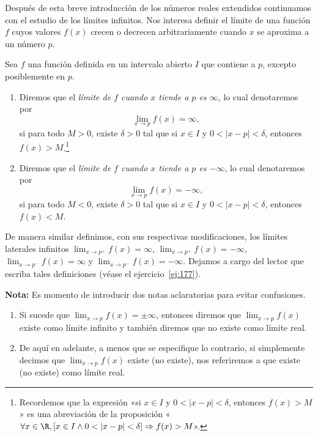 \documentclass[12pt,a4paper]{book}
\begin{document}
    Después de esta breve introducción de los números reales extendidos continuamos
    con el estudio de los límites infinitos. Nos interesa definir el límite de
    una función $f$ cuyos valores $f(x)$ crecen o decrecen arbitrariamente cuando
    $x$ se aproxima a un número $p$.

    \begin{definicion}\label{def:33}
        Sea $f$ una función definida en un intervalo
        abierto $I$ que contiene a $p$, excepto posiblemente en $p$.
        \begin{enumerate}
            \item Diremos que el \textit{límite de $f$ cuando $x$ tiende a $p$ es $\infty$}, lo cual denotaremos
            por
            \begin{equation}\label{eq:4.20}
                \lim_{x\to p}f(x)=\infty,
            \end{equation}
            si para todo $M>0$, existe $\delta>0$ tal que si $x\in I$ y $0<|x-p|<\delta$,
            entonces $f(x)>M$.\footnote{Recordemos que la expresión «si $x\in I$ y $0<|x-p|<\delta$, entonces $f(x)>M$» es una
            abreviación de la proposición «$\forall x\in\R,[x\in I\wedge 0<|x-p|<\delta]\Rightarrow f(x)>M$».}
            \item Diremos que el \textit{límite de $f$ cuando $x$ tiende a $p$ es $-\infty$}, lo cual denotaremos
            por
            \begin{equation}\label{eq:4.21}
                \lim_{x\to p}f(x)=-\infty,
            \end{equation}
            si para todo $M<0$, existe $\delta>0$ tal que si $x\in I$ y $0<|x-p|<\delta$,
            entonces $f(x)<M$.
        \end{enumerate}
    \end{definicion}

    De manera similar definimos, con sus respectivas modificaciones, los límites
    laterales infinitos $\lim_{x\to p^{+}}f(x)=\infty$, $\lim_{x\to p^{+}}f(x)=-\infty$, $\lim_{x\to p^{-}}f(x)=
    \infty$ y $\lim_{x\to p^{-}}f(x)=-\infty$. Dejamos a cargo del lector que escriba tales
    definiciones (véase el ejercicio~\ref{ej:177}).

    \textbf{Nota:} Es momento de introducir dos notas aclaratorias para evitar
    confusiones.
    \begin{enumerate}[label=\arabic*.,nosep]
        \item Si sucede que $\lim_{x\to p}f(x)=\pm\infty$, entonces diremos que $\lim_{x\to p}f(x)$ existe
        como límite infinito y también diremos que no existe como límite real.
        \item De aquí en adelante, a menos que se especifique lo contrario, si simplemente
        decimos que $\lim_{x\to p}f(x)$ existe (no existe), nos referiremos a que existe
        (no existe) como límite real.
    \end{enumerate}
\end{document}
